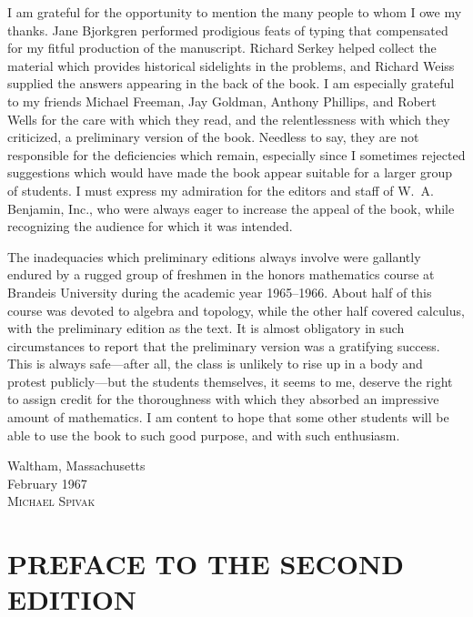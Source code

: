 I am grateful for the opportunity to mention the many people to whom I owe my
thanks. Jane Bjorkgren performed prodigious feats of typing that compensated
for my fitful production of the manuscript. Richard Serkey helped collect the
material which provides historical sidelights in the problems, and Richard
Weiss supplied the answers appearing in the back of the book. I am especially
grateful to my friends Michael Freeman, Jay Goldman, Anthony Phillips, and
Robert Wells for the care with which they read, and the relentlessness with
which they criticized, a preliminary version of the book. Needless to say,
they are not responsible for the deficiencies which remain, especially since I
sometimes rejected suggestions which would have made the book appear suitable
for a larger group of students. I must express my admiration for the editors
and staff of W.~A. Benjamin, Inc., who were always eager to increase the
appeal of the book, while recognizing the audience for which it was intended.

The inadequacies which preliminary editions always involve were gallantly
endured by a rugged group of freshmen in the honors mathematics course at
Brandeis University during the academic year 1965--1966. About half of this
course was devoted to algebra and topology, while the other half covered
calculus, with the preliminary edition as the text. It is almost obligatory in
such circumstances to report that the preliminary version was a gratifying
success. This is always safe---after all, the class is unlikely to rise up in
a body and protest publicly---but the students themselves, it seems to me,
deserve the right to assign credit for the thoroughness with which they
absorbed an impressive amount of mathematics. I am content to hope that some
other students will be able to use the book to such good purpose, and with
such enthusiasm.

\begin{flushright}
  \begin{minipage}{0.4\textwidth}
    \noindent Waltham, Massachusetts\\[0.5em]
    February 1967\\[2em]
    \scshape Michael Spivak
  \end{minipage}
\end{flushright}

\clearpage
\section*{\mdseries PREFACE TO THE SECOND EDITION}


